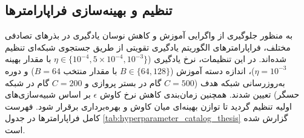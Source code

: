 \documentclass[oneside,openany,phd]{TMU-Thesis}
\begin{document}
\subsection{تنظیم و بهینه‌سازی فراپارامترها}
\label{subsec:param_calibration}
به منظور جلوگیری از واگرایی آموزش و کاهش نوسان یادگیری در بذرهای تصادفی مختلف، فراپارامترهای الگوریتم یادگیری تقویتی از طریق جستجوی شبکه‌ای تنظیم شده‌اند. در این تنظیمات، نرخ یادگیری ($\eta \in \{10^{-4}, 5 \times 10^{-4}, 10^{-3}\}$ با مقدار بهینه $\eta = 10^{-3}$)، اندازه دسته آموزش ($B \in \{64, 128\}$ با مقدار منتخب $B = 64$) و دوره به‌روزرسانی شبکه هدف ($C = 500$ گام در بستر پروازی و $C = 200$ گام در شبکه حسگر) تعیین شدند. همچنین زمان‌بندی کاهش نرخ کاوش $\epsilon$ بر اساس شبیه‌سازی‌های اولیه تنظیم گردید تا توازن بهینه‌ای میان کاوش و بهره‌برداری برقرار شود. فهرست کامل فراپارامترها در جدول \ref{tab:hyperparameter_catalog_thesis} گزارش شده است.
\end{document}
